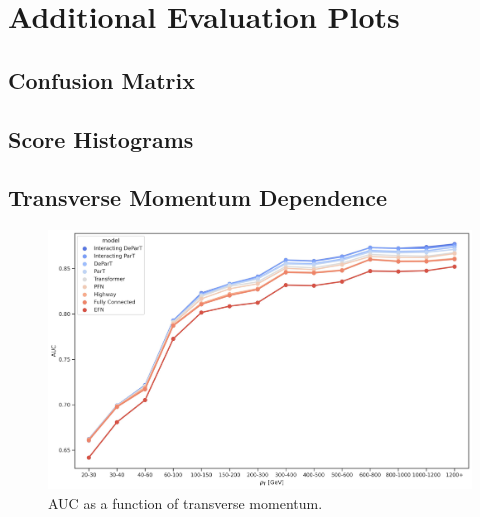 \chapter{Additional Evaluation Plots}
\label{ch:eval}

\section{Confusion Matrix}
\label{sec:app_confusion}


\FloatBarrier
\newpage

\section{Score Histograms}
\label{sec:app_scorehist}


\FloatBarrier

\section{Transverse Momentum Dependence}
\label{sec:app_pt_dep}


\begin{figure}[htb]
    \centering
    \includegraphics[width=1\linewidth]{src/plots/results/pT_dep/auc.jpg}
    \caption{AUC as a function of transverse momentum.}
    \label{fig:auc_pt}
\end{figure}

